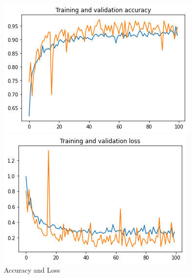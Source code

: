 \begin{figure}[ht]
  \centering
  \begin{minipage}[b]{0.4\linewidth}
    \centering
    \includegraphics[width=\linewidth]{Chapters/Chapter_5/figures/Training_and_validation_accuracy.png}
  \end{minipage}
  \hfill
  \begin{minipage}[b]{0.4\linewidth}
    \centering
    \includegraphics[width=\linewidth]{Chapters/Chapter_5/figures/Training_and_validation_loss.png}
  \end{minipage}
  \caption{Accuracy and Loss}
  \label{fig:figure5_3}
  \end{figure}
  
  
